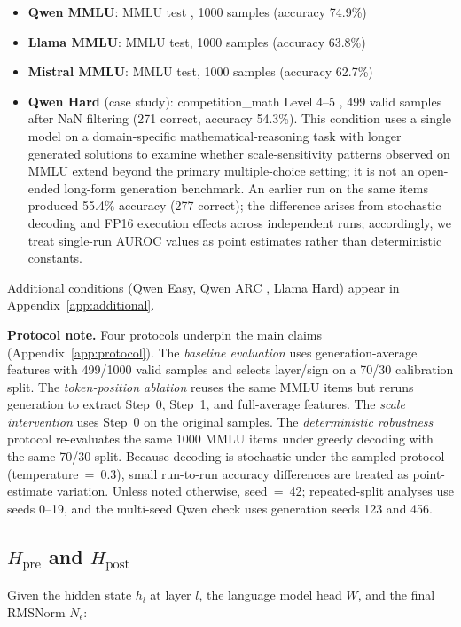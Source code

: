 \documentclass{ieeeaccess}
\newcommand{\Hpre}{H_{\text{pre}}}
\newcommand{\Hpost}{H_{\text{post}}}
\begin{document}
\begin{itemize}
\item \textbf{Qwen MMLU}: MMLU test \cite{hendrycks2021mmlu}, 1000 samples (accuracy 74.9\%)
\item \textbf{Llama MMLU}: MMLU test, 1000 samples (accuracy 63.8\%)
\item \textbf{Mistral MMLU}: MMLU test, 1000 samples (accuracy 62.7\%)
\item \textbf{Qwen Hard} (case study): competition\_math Level 4--5 \cite{hendrycks2021math}, 499 valid samples after NaN filtering (271 correct, accuracy 54.3\%). This condition uses a single model on a domain-specific mathematical-reasoning task with longer generated solutions to examine whether scale-sensitivity patterns observed on MMLU extend beyond the primary multiple-choice setting; it is not an open-ended long-form generation benchmark. An earlier run on the same items produced 55.4\% accuracy (277 correct); the difference arises from stochastic decoding and FP16 execution effects across independent runs; accordingly, we treat single-run AUROC values as point estimates rather than deterministic constants.
\end{itemize}

Additional conditions (Qwen Easy, Qwen ARC \cite{clark2018arc}, Llama Hard) appear in Appendix~\ref{app:additional}.

\textbf{Protocol note.} Four protocols underpin the main claims (Appendix~\ref{app:protocol}). The \textit{baseline evaluation} uses generation-average features with 499/1000 valid samples and selects layer/sign on a 70/30 calibration split. The \textit{token-position ablation} reuses the same MMLU items but reruns generation to extract Step~0, Step~1, and full-average features. The \textit{scale intervention} uses Step~0 on the original samples. The \textit{deterministic robustness} protocol re-evaluates the same 1000 MMLU items under greedy decoding with the same 70/30 split. Because decoding is stochastic under the sampled protocol (temperature~=~0.3), small run-to-run accuracy differences are treated as point-estimate variation. Unless noted otherwise, seed~=~42; repeated-split analyses use seeds 0--19, and the multi-seed Qwen check uses generation seeds 123 and 456.

\subsection{$\Hpre$ and $\Hpost$}

Given the hidden state $h_l$ at layer $l$, the language model head $W$, and the final RMSNorm $N_\epsilon$:
\end{document}
